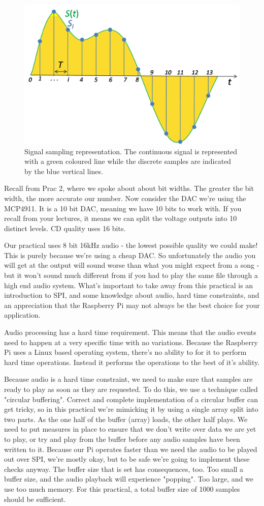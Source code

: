 \begin{figure}[H]
\centering
\includegraphics[width=0.6\columnwidth]{Figures/Signal_Sampling}
\caption{Signal sampling representation. The continuous signal is represented with a green coloured line while the discrete samples are indicated by the blue vertical lines.}
\label{fig:Signal_Sampling}
\end{figure}

Recall from Prac 2, where we spoke about about bit widths. The greater the bit width, the more accurate our number. Now consider the DAC we're using the MCP4911. It is a 10 bit DAC, meaning we have 10 bits to work with. If you recall from your lectures, it means we can split the voltage outputs into 10 distinct levels. CD quality uses 16 bits.

Our practical uses 8 bit 16kHz audio - the lowest possible quality we could make! This is purely because we're using a cheap DAC. So unfortunately the audio you will get at the output will sound worse than what you might expect from a song - but it won't sound much different from if you had to play the same file through a high end audio system. What's important to take away from this practical is an introduction to SPI, and some knowledge about audio, hard time constraints, and an appreciation that the Raspberry Pi may not always be the best choice for your application. 

Audio processing has a hard time requirement. This means that the audio events need to happen at a very specific time with no variations. Because the Raspberry Pi uses a Linux based operating system, there's no ability to for it to perform hard time operations. Instead it performs the operations to the best of it's ability. 

Because audio is a hard time constraint, we need to make sure that samples are ready to play as soon as they are requested. To do this, we use a technique called "circular buffering". Correct and complete implementation of a circular buffer can get tricky, so in this practical we're mimicking it by using a single array split into two parts. As the one half of the buffer (array) loads, the other half plays. We need to put measures in place to ensure that we don't write over data we are yet to play, or try and play from the buffer before any audio samples have been written to it. Because our Pi operates faster than we need the audio to be played out over SPI, we're mostly okay, but to be safe we're going to implement these checks anyway. The buffer size that is set has consequences, too. Too small a buffer size, and the audio playback will experience "popping". Too large, and we use too much memory. For this practical, a total buffer size of 1000 samples should be sufficient.


